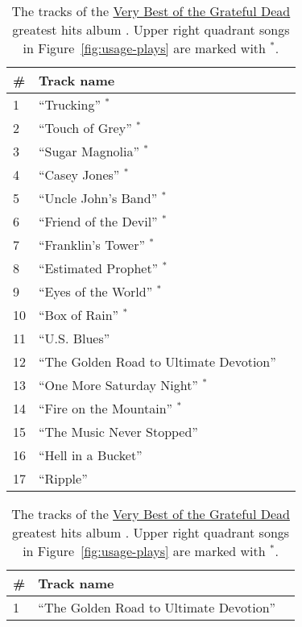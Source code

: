 \documentclass{svmult}
\newcommand{\ttt}[1]{``#1''}
\newcommand{\album}[1]{\uline{#1}}
\begin{document}
\begin{table}
    \begin{minipage}{2.75in}
    \begin{center}
\begin{footnotesize}
    \begin{tabular}{lll}
\hline
\textbf{\#}&\textbf{\hspace{0.1in}Track name}\\\hline
1&\ttt{Trucking} $^*$\\ 	 	
2&\ttt{Touch of Grey} $^*$\\
3&\ttt{Sugar Magnolia} $^*$\\
4&\ttt{Casey Jones} $^*$\\ 	
5&\ttt{Uncle John's Band} $^*$\\
6&\ttt{Friend of the Devil} $^*$\\
7&\ttt{Franklin's Tower} $^*$\\
8&\ttt{Estimated Prophet} $^*$\\	
9&\ttt{Eyes of the World} $^*$\\	
10&\ttt{Box of Rain} $^*$\\	
11&\ttt{U.S.  Blues}\\
12&\ttt{The Golden Road to Ultimate Devotion}\\
13&\ttt{One More Saturday Night} $^*$\\
14&\ttt{Fire on the Mountain} $^*$\\
15&\ttt{The Music Never Stopped}\\
16&\ttt{Hell in a Bucket}\\
17&\ttt{Ripple}\\
\hline
\end{tabular}
\caption{\label{tab:hits1}The tracks of the \album{Very Best of the Grateful Dead} greatest hits album \cite{hits:dead2003}.  Upper right quadrant songs in Figure~\ref{fig:usage-plays} are marked with $^{*}$.}
\end{footnotesize}
\end{center}
    \end{minipage}
    \qquad
    \begin{minipage}{2.75in}
    \begin{center}
\begin{footnotesize}
    \begin{tabular}{lll}
\hline
\textbf{\#}&\textbf{\hspace{0.1in}Track name}\\\hline
1&\ttt{The Golden Road to Ultimate Devotion}\\ 	

\end{tabular}
\end{footnotesize}
\end{center}
\end{minipage}
\end{table}
\end{document}
